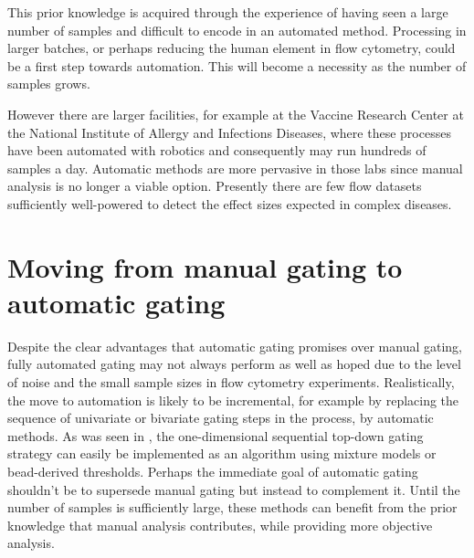 This prior knowledge is acquired through the experience of having seen a large number of samples and difficult to encode in an automated method.
Processing in larger batches, or perhaps reducing the human element in flow cytometry, could be a first step towards automation.
This will become a necessity as the number of samples grows.

However there are larger facilities, for example at the Vaccine Research Center at the National Institute of Allergy and Infections Diseases, where these processes have been automated with robotics and consequently may run hundreds of samples a day.
Automatic methods are more pervasive in those labs since manual analysis is no longer a viable option.
Presently there are few flow datasets sufficiently well-powered to detect the effect sizes expected in complex diseases.


\section{ Moving from manual gating to automatic gating }

Despite the clear advantages that automatic gating promises over manual gating, fully automated gating may not always perform as well as hoped due to the level of noise and the small sample sizes in flow cytometry experiments.
Realistically, the move to automation is likely to be incremental, for example by replacing the sequence of univariate or bivariate gating steps in the process, by automatic methods.
As was seen in , the one-dimensional sequential top-down gating strategy can easily be implemented as an algorithm using mixture models or bead-derived thresholds.  
Perhaps the immediate goal of automatic gating shouldn't be to supersede manual gating but instead to complement it.
Until the number of samples is sufficiently large, these methods can benefit from the prior knowledge that manual analysis contributes, while providing more objective analysis.


